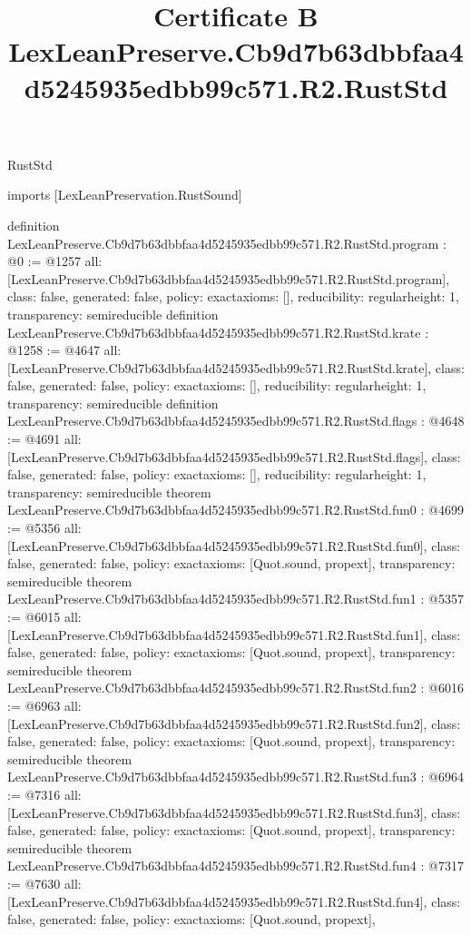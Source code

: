 \begin{lexlean}{RustStd}
\title{Certificate B LexLeanPreserve.Cb9d7b63dbbfaa4d5245935edbb99c571.R2.RustStd}
\begin{coremodule}
imports [LexLeanPreservation.RustSound]

definition LexLeanPreserve.Cb9d7b63dbbfaa4d5245935edbb99c571.R2.RustStd.program : @0 := @1257 {
  all: [LexLeanPreserve.Cb9d7b63dbbfaa4d5245935edbb99c571.R2.RustStd.program],
  class: false,
  generated: false,
  policy: exact{axioms: []},
  reducibility: regular{height: 1},
  transparency: semireducible
}
definition LexLeanPreserve.Cb9d7b63dbbfaa4d5245935edbb99c571.R2.RustStd.krate : @1258 := @4647 {
  all: [LexLeanPreserve.Cb9d7b63dbbfaa4d5245935edbb99c571.R2.RustStd.krate],
  class: false,
  generated: false,
  policy: exact{axioms: []},
  reducibility: regular{height: 1},
  transparency: semireducible
}
definition LexLeanPreserve.Cb9d7b63dbbfaa4d5245935edbb99c571.R2.RustStd.flags : @4648 := @4691 {
  all: [LexLeanPreserve.Cb9d7b63dbbfaa4d5245935edbb99c571.R2.RustStd.flags],
  class: false,
  generated: false,
  policy: exact{axioms: []},
  reducibility: regular{height: 1},
  transparency: semireducible
}
theorem LexLeanPreserve.Cb9d7b63dbbfaa4d5245935edbb99c571.R2.RustStd.fun0 : @4699 := @5356 {
  all: [LexLeanPreserve.Cb9d7b63dbbfaa4d5245935edbb99c571.R2.RustStd.fun0],
  class: false,
  generated: false,
  policy: exact{axioms: [Quot.sound, propext]},
  transparency: semireducible
}
theorem LexLeanPreserve.Cb9d7b63dbbfaa4d5245935edbb99c571.R2.RustStd.fun1 : @5357 := @6015 {
  all: [LexLeanPreserve.Cb9d7b63dbbfaa4d5245935edbb99c571.R2.RustStd.fun1],
  class: false,
  generated: false,
  policy: exact{axioms: [Quot.sound, propext]},
  transparency: semireducible
}
theorem LexLeanPreserve.Cb9d7b63dbbfaa4d5245935edbb99c571.R2.RustStd.fun2 : @6016 := @6963 {
  all: [LexLeanPreserve.Cb9d7b63dbbfaa4d5245935edbb99c571.R2.RustStd.fun2],
  class: false,
  generated: false,
  policy: exact{axioms: [Quot.sound, propext]},
  transparency: semireducible
}
theorem LexLeanPreserve.Cb9d7b63dbbfaa4d5245935edbb99c571.R2.RustStd.fun3 : @6964 := @7316 {
  all: [LexLeanPreserve.Cb9d7b63dbbfaa4d5245935edbb99c571.R2.RustStd.fun3],
  class: false,
  generated: false,
  policy: exact{axioms: [Quot.sound, propext]},
  transparency: semireducible
}
theorem LexLeanPreserve.Cb9d7b63dbbfaa4d5245935edbb99c571.R2.RustStd.fun4 : @7317 := @7630 {
  all: [LexLeanPreserve.Cb9d7b63dbbfaa4d5245935edbb99c571.R2.RustStd.fun4],
  class: false,
  generated: false,
  policy: exact{axioms: [Quot.sound, propext]},
}
\end{coremodule}
\end{lexlean}

